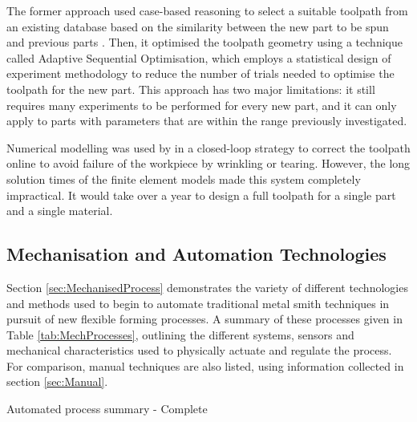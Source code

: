 The former approach used case-based reasoning to select a suitable toolpath from an existing database based on the similarity between the new part to be spun and previous parts \citep{Henkenjohann2005AnProcess}. Then, it optimised the toolpath geometry using a technique called Adaptive Sequential Optimisation, which employs a statistical design of experiment methodology to reduce the number of trials needed to optimise the toolpath for the new part. This approach has two major limitations: it still requires many experiments to be performed for every new part, and it can only apply to parts with parameters that are within the range previously investigated. 

Numerical modelling was used by \citep{Polyblank2015ParametricSpinning} in a closed-loop strategy to correct the toolpath online to avoid failure of the workpiece by wrinkling or tearing. However, the long solution times of the finite element models made this system completely impractical. It would take over a year to design a full toolpath for a single part and a single material. 

\subsection{Mechanisation and Automation Technologies \label{sec:MechandAuto}}
Section \ref{sec:MechanisedProcess} demonstrates the variety of different technologies and methods used to begin to automate traditional metal smith techniques in pursuit of new flexible forming processes. A summary of these processes given in Table \ref{tab:MechProcesses}, outlining the different systems, sensors and mechanical characteristics used to physically actuate and regulate the process. For comparison, manual techniques are also listed, using information collected in section \ref{sec:Manual}.

%        

\newpage



\begin{landscape}
\begin{table}[h] 
    \centering
    \resizebox{\linewidth}{!}{
        
        }
    \caption{Automated process summary - Complete}
    \label{tab:MechProcessesOLD}
\end{table}
\end{landscape}

